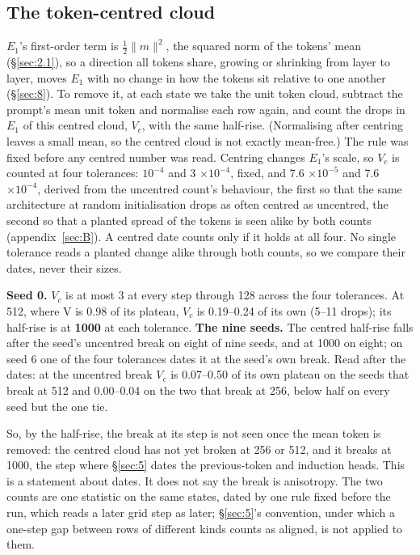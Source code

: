 \documentclass[11pt]{article}
\begin{document}
\subsection{The token-centred cloud}\label{sec:4.1}

$E_{1}$'s first-order term is $\tfrac12\|m\|^{2}$, the squared norm of the tokens' mean (\S\ref{sec:2.1}), so a direction all tokens share, growing or shrinking from layer to layer, moves $E_{1}$ with no change in how the tokens sit relative to one another (\S\ref{sec:8}). To remove it, at each state we take the unit token cloud, subtract the prompt's mean unit token and normalise each row again, and count the drops in $E_{1}$ of this centred cloud, $V_c$, with the same half-rise. (Normalising after centring leaves a small mean, so the centred cloud is not exactly mean-free.) The rule was fixed before any centred number was read. Centring changes $E_{1}$'s scale, so $V_c$ is counted at four tolerances: $10^{-4}$ and 3 $\times 10^{-4}$, fixed, and 7.6 $\times 10^{-5}$ and 7.6 $\times 10^{-4}$, derived from the uncentred count's behaviour, the first so that the same architecture at random initialisation drops as often centred as uncentred, the second so that a planted spread of the tokens is seen alike by both counts (appendix~\ref{sec:B}). A centred date counts only if it holds at all four. No single tolerance reads a planted change alike through both counts, so we compare their dates, never their sizes.

\textbf{Seed 0.} $V_c$ is at most 3 at every step through 128 across the four tolerances. At 512, where V is 0.98 of its plateau, $V_c$ is 0.19--0.24 of its own (5--11 drops); its half-rise is at \textbf{1000} at each tolerance. \textbf{The nine seeds.} The centred half-rise falls after the seed's uncentred break on eight of nine seeds, and at 1000 on eight; on seed 6 one of the four tolerances dates it at the seed's own break. Read after the dates: at the uncentred break $V_c$ is 0.07--0.50 of its own plateau on the seeds that break at 512 and 0.00--0.04 on the two that break at 256, below half on every seed but the one tie.

So, by the half-rise, the break at its step is not seen once the mean token is removed: the centred cloud has not yet broken at 256 or 512, and it breaks at 1000, the step where \S\ref{sec:5} dates the previous-token and induction heads. This is a statement about dates. It does not say the break is anisotropy. The two counts are one statistic on the same states, dated by one rule fixed before the run, which reads a later grid step as later; \S\ref{sec:5}'s convention, under which a one-step gap between rows of different kinds counts as aligned, is not applied to them.
\end{document}

